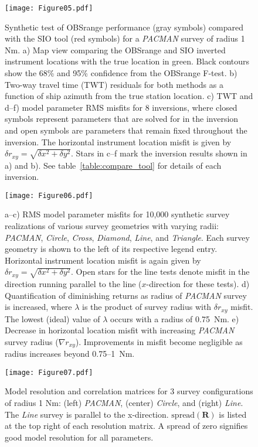 \begin{figure}[h]
\texttt{[image: Figure05.pdf]}
\caption{ Synthetic test of OBSrange performance (gray symbols) compared with the SIO tool (red symbols) for a \textit{PACMAN} survey of radius 1 Nm. a) Map view comparing the OBSrange and SIO inverted instrument locations with the true location in green. Black contours show the 68\% and 95\% confidence from the OBSrange F-test. b) Two-way travel time (TWT) residuals for both methods as a function of ship azimuth from the true station location. c) TWT and d--f) model parameter RMS misfits for 8 inversions, where closed symbols represent parameters that are solved for in the inversion and open symbols are parameters that remain fixed throughout the inversion. The horizontal instrument location misfit is given by $\delta r_{xy} = \sqrt{\delta x^2 + \delta y^2} $. Stars in c--f mark the inversion results shown in a) and b). See table~\ref{table:compare_tool} for details of each inversion.}
\label{fig:compare_tool}
\end{figure}

\begin{figure}[h]
\texttt{[image: Figure06.pdf]}
\caption{ a--c) RMS model parameter misfits for 10,000 synthetic survey realizations of various survey geometries with varying radii: \textit{PACMAN}, \textit{Circle}, \textit{Cross}, \textit{Diamond}, \textit{Line}, and \textit{Triangle}. Each survey geometry is shown to the left of its respective legend entry. Horizontal instrument location misfit is again given by $\delta r_{xy} = \sqrt{\delta x^2 + \delta y^2} $. Open stars for the line tests denote misfit in the direction running parallel to the line ($x$-direction for these tests). d) Quantification of diminishing returns as radius of \textit{PACMAN} survey is increased, where $\lambda$ is the product of survey radius with $\delta r_{xy}$ misfit. The lowest (ideal) value of $\lambda$ occurs with a radius of 0.75~Nm. e) Decrease in horizontal location misfit with increasing \textit{PACMAN} survey radius ($\nabla r_{xy}$). Improvements in misfit become negligible as radius increases beyond 0.75--1~Nm.}
\label{fig:survey_geom_explore}
\end{figure}

\begin{figure}[h]
\texttt{[image: Figure07.pdf]}
\caption{ Model resolution and correlation matrices for 3 survey configurations of radius 1 Nm: (left) \textit{PACMAN}, (center) \textit{Circle}, and (right) \textit{Line}. The \textit{Line} survey is parallel to the x-direction. $\text{spread}(\mathbf{R})$ is listed at the top right of each resolution matrix. A spread of zero signifies good model resolution for all parameters. }
\label{fig:resolution_correlation}
\end{figure}